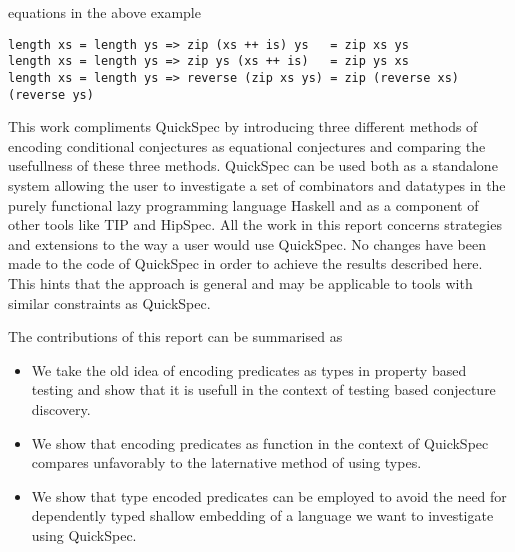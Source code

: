 equations in the above example
\begin{verbatim}
length xs = length ys => zip (xs ++ is) ys   = zip xs ys
length xs = length ys => zip ys (xs ++ is)   = zip ys xs
length xs = length ys => reverse (zip xs ys) = zip (reverse xs) (reverse ys)
\end{verbatim}
This work compliments QuickSpec by introducing three different methods
of encoding conditional conjectures as equational conjectures and comparing
the usefullness of these three methods. QuickSpec can be used both as a standalone
system allowing the user to investigate a set of combinators and datatypes in the
purely functional lazy programming language Haskell and as a component of other tools %
like TIP\cite{Rosen2015} and HipSpec\cite{Claessen2013}. 
All the work in this report concerns strategies and extensions to the way a user would
use QuickSpec. No changes have been made to the code of QuickSpec in order to
achieve the results described here. This hints that the approach is general
and may be applicable to tools with similar constraints as QuickSpec.

The contributions of this report can be summarised as
\begin{itemize}
    \item We take the old idea of encoding predicates as types
        in property based testing and show that it is usefull in
        the context of testing based conjecture discovery.

    \item We show that encoding predicates as function in the context
        of QuickSpec compares unfavorably to the laternative method
        of using types.

    \item We show that type encoded predicates can be employed to avoid 
        the need for dependently typed shallow embedding of a language
        we want to investigate using QuickSpec.
\end{itemize}
